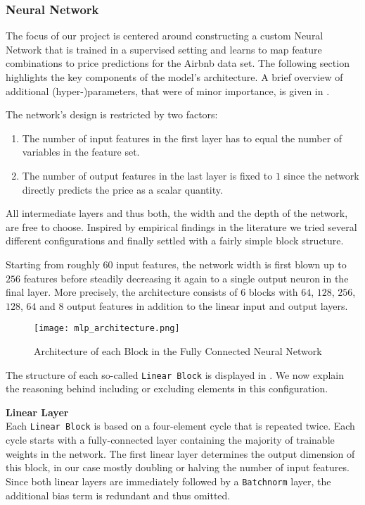 \subsubsection{Neural Network} \label{neural-network}

The focus of our project is centered around constructing a custom Neural Network that is trained in a supervised setting and learns to map feature combinations to price predictions for the Airbnb data set.
The following section highlights the key components of the model's architecture.
A brief overview of additional (hyper-)parameters, that were of minor importance, is given in .

The network's design is restricted by two factors:
\begin{enumerate}
  \item The number of input features in the first layer has to equal the number of variables in the feature set.
  \item The number of output features in the last layer is fixed to $1$ since the network directly predicts the price as a scalar quantity.
\end{enumerate}
All intermediate layers and thus both, the width and the depth of the network, are free to choose.
Inspired by empirical findings in the literature we tried several different configurations and finally settled with a fairly simple block structure.

Starting from roughly $60$ input features, the network width is first blown up to $256$ features before steadily decreasing it again to a single output neuron in the final layer.
More precisely, the architecture consists of $6$ blocks with $64$, $128$, $256$, $128$, $64$ and $8$ output features in addition to the linear input and output layers.

\begin{figure}[t]
  \centering
  \texttt{[image: mlp\_architecture.png]}
  \caption{Architecture of each Block in the Fully Connected Neural Network}
  \label{fig:linear-block}
\end{figure}

The structure of each so-called \texttt{Linear Block} is displayed in .
We now explain the reasoning behind including or excluding elements in this configuration.

\textbf{Linear Layer} \\
Each \texttt{Linear Block} is based on a four-element cycle that is repeated twice.
Each cycle starts with a fully-connected layer containing the majority of trainable weights in the network.
The first linear layer determines the output dimension of this block, in our case mostly doubling or halving the number of input features.
Since both linear layers are immediately followed by a \texttt{Batchnorm} layer, the additional bias term is redundant and thus omitted.

